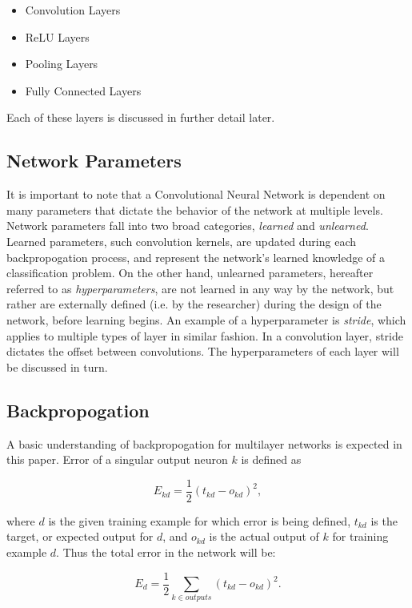 \documentclass[a4paper, 11pt]{article} %
\begin{document}
\begin{itemize}
	\item Convolution Layers
	\item ReLU Layers
	\item Pooling Layers
	\item Fully Connected Layers
\end{itemize}

Each of these layers is discussed in further detail later.

\subsection*{Network Parameters}

It is important to note that a Convolutional Neural Network is dependent on many parameters that dictate the behavior of the network at multiple levels.  Network parameters fall into two broad categories, \textit{learned} and \textit{unlearned}.  Learned parameters, such convolution kernels, are updated during each backpropogation process, and represent the network's learned knowledge of a classification problem.  On the other hand, unlearned parameters, hereafter referred to as \textit{hyperparameters}, are not learned in any way by the network, but rather are externally defined (i.e. by the researcher) during the design of the network, before learning begins.  An example of a hyperparameter is \textit{stride}, which applies to multiple types of layer in similar fashion.  In a convolution layer, stride dictates the offset between convolutions.  The hyperparameters of each layer will be discussed in turn.

\subsection*{Backpropogation}

A basic understanding of backpropogation for multilayer networks is expected in this paper.  Error of a singular output neuron $k$ is defined as

\begin{equation}
E_{kd} = \frac{1}{2} (t_{kd} - o_{kd})^2,
\end{equation}

where $d$ is the given training example for which error is being defined, $t_{kd}$ is the target, or expected output for $d$, and $o_{kd}$ is the actual output of $k$ for training example $d$.  Thus the total error in the network will be:

\begin{equation}
E_{d} = \frac{1}{2} \sum_{k \in outputs} (t_{kd} - o_{kd})^2.
\end{equation}
\end{document}
